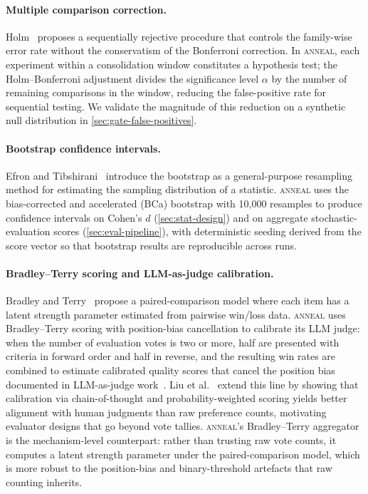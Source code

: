 \paragraph{Multiple comparison correction.}
Holm~\cite{holm1979simple} proposes a sequentially rejective procedure that controls the family-wise error rate without the conservatism of the Bonferroni correction.
In \textsc{anneal}, each experiment within a consolidation window constitutes a hypothesis test; the Holm--Bonferroni adjustment divides the significance level $\alpha$ by the number of remaining comparisons in the window, reducing the false-positive rate for sequential testing.
We validate the magnitude of this reduction on a synthetic null distribution in \cref{sec:gate-false-positives}.

\paragraph{Bootstrap confidence intervals.}
Efron and Tibshirani~\cite{efron1994bootstrap} introduce the bootstrap as a general-purpose resampling method for estimating the sampling distribution of a statistic.
\textsc{anneal} uses the bias-corrected and accelerated (BCa) bootstrap with 10{,}000 resamples to produce confidence intervals on Cohen's $d$ (\cref{sec:stat-design}) and on aggregate stochastic-evaluation scores (\cref{sec:eval-pipeline}), with deterministic seeding derived from the score vector so that bootstrap results are reproducible across runs.

\paragraph{Bradley--Terry scoring and LLM-as-judge calibration.}
Bradley and Terry~\cite{bradley1952rank} propose a paired-comparison model where each item has a latent strength parameter estimated from pairwise win/loss data.
\textsc{anneal} uses Bradley--Terry scoring with position-bias cancellation to calibrate its LLM judge: when the number of evaluation votes is two or more, half are presented with criteria in forward order and half in reverse, and the resulting win rates are combined to estimate calibrated quality scores that cancel the position bias documented in LLM-as-judge work~\cite{zheng2023judging}.
Liu et al.~\cite{liu2023geval} extend this line by showing that calibration via chain-of-thought and probability-weighted scoring yields better alignment with human judgments than raw preference counts, motivating evaluator designs that go beyond vote tallies.
\textsc{anneal}'s Bradley--Terry aggregator is the mechanism-level counterpart: rather than trusting raw vote counts, it computes a latent strength parameter under the paired-comparison model, which is more robust to the position-bias and binary-threshold artefacts that raw counting inherits.
